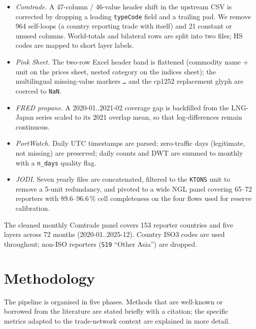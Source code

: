 \documentclass[11pt,a4paper]{article}
\begin{document}
\begin{itemize}[leftmargin=1.4em, itemsep=0.15em]
  \item \emph{Comtrade.} A 47-column / 46-value header shift in the
        upstream CSV is corrected by dropping a leading
        \texttt{typeCode} field and a trailing pad. We remove
        964 self-loops (a country reporting trade with itself) and
        21 constant or unused columns. World-totals and bilateral
        rows are split into two files; HS codes are mapped to short
        layer labels.
  \item \emph{Pink Sheet.} The two-row Excel header band is flattened
        (commodity name + unit on the prices sheet, nested category
        on the indices sheet); the multilingual missing-value markers
        \texttt{\dots} and the cp1252 replacement glyph are coerced
        to \texttt{NaN}.
  \item \emph{FRED propane.} A 2020-01..2021-02 coverage gap is
        backfilled from the LNG-Japan series scaled to its 2021
        overlap mean, so that log-differences remain continuous.
  \item \emph{PortWatch.} Daily UTC timestamps are parsed; zero-traffic
        days (legitimate, not missing) are preserved; daily counts
        and DWT are summed to monthly with a \texttt{n\_days}
        quality flag.
  \item \emph{JODI.} Seven yearly files are concatenated, filtered to
        the \texttt{KTONS} unit to remove a 5-unit redundancy, and
        pivoted to a wide NGL panel covering 65--72 reporters with
        89.6--96.6\,\% cell completeness on the four flows used for
        reserve calibration.
\end{itemize}

The cleaned monthly Comtrade panel covers 153 reporter countries and
five layers across 72 months (2020-01..2025-12). Country ISO3 codes are
used throughout; non-ISO reporters (\texttt{S19} ``Other Asia'') are
dropped.

\section{Methodology}

The pipeline is organised in five phases. Methods that are well-known
or borrowed from the literature are stated briefly with a citation; the
specific metrics adapted to the trade-network context are explained in
more detail.
\end{document}

